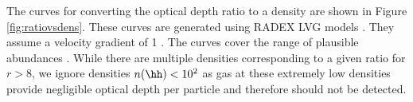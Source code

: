 The curves for converting the optical depth ratio to a density are shown in
Figure \ref{fig:ratiovsdens}.  These curves are generated using RADEX LVG models
\citep[python wrapper \url{https://github.com/keflavich/pyradex/}; original
code][]{van-Der-Tak2007a}.  They assume a velocity gradient of 1 \kms \perpc.
The curves cover the range of plausible \formaldehyde abundances
\citep{Mangum1993a}.  While there are multiple densities corresponding to a
given ratio for $r>8$, we ignore densities $n(\hh)<10^2$ \percc as gas at these
extremely low densities provide negligible optical depth per particle and
therefore should not be detected.

% 
% 
% 
